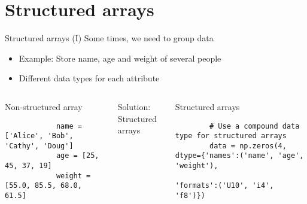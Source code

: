\documentclass[10pt,compress]{beamer} %
\begin{document}
\section{Structured arrays}

\begin{frame}[fragile]{Structured arrays (I)}
	Some times, we need to group data
	\begin{itemize}
		\item Example: Store name, age and weight of several people
		\item Different data types for each attribute
	\end{itemize}
	\begin{columns}
 	   \column{\textwidth}
		\begin{exampleblock}{\footnotesize{Non-structured array}}
		\vspace{-0.2cm} 
		\begin{lstlisting}
			name = ['Alice', 'Bob', 'Cathy', 'Doug']
			age = [25, 45, 37, 19]
			weight = [55.0, 85.5, 68.0, 61.5]
		\end{lstlisting}
		\vspace{-0.2cm} 
	\end{exampleblock}
	
	\vspace{-0.2cm}
	\begin{flushleft}
	Solution: Structured arrays
	\end{flushleft}
	\vspace{-0.2cm}
	\begin{exampleblock}{\footnotesize{Structured arrays}}
		\vspace{-0.2cm} 
		\begin{lstlisting}
		# Use a compound data type for structured arrays
		data = np.zeros(4, dtype={'names':('name', 'age', 'weight'),
                          'formats':('U10', 'i4', 'f8')})
		\end{lstlisting}
		\vspace{-0.2cm} 
	\end{exampleblock}
	\end{columns}
\end{frame}
\end{document}
